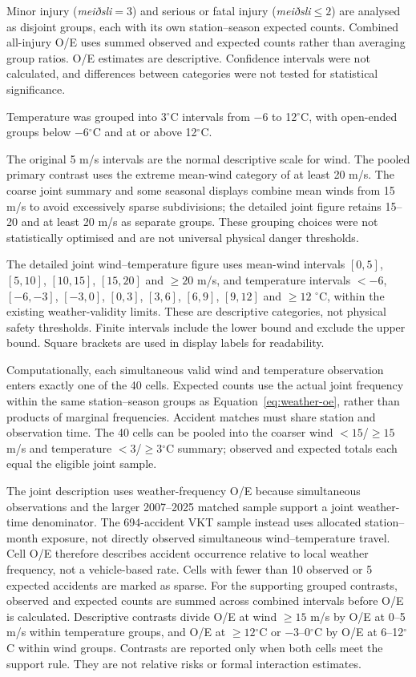 Minor injury (\textit{meiðsli}\(=3\)) and serious or fatal injury
(\textit{meiðsli}\(\leq2\)) are analysed as disjoint groups, each with its
own station--season expected counts. Combined all-injury O/E uses summed
observed and expected counts rather than averaging group ratios. O/E estimates are descriptive. Confidence intervals were not calculated,
and differences between categories were not tested for statistical significance.

Temperature was grouped into 3$^{\circ}$C intervals from $-6$ to 12$^{\circ}$C, with open-ended groups below $-6$$^{\circ}$C and at or above 12$^{\circ}$C.

The original 5 m/s intervals are the normal descriptive scale for wind. The pooled primary contrast uses the extreme mean-wind category of at least 20 m/s. The coarse joint summary and some seasonal displays combine mean winds from 15 m/s to avoid excessively sparse subdivisions; the detailed joint figure retains 15--20 and at least 20 m/s as separate groups. These grouping choices were not statistically optimised and are not universal physical danger thresholds.

The detailed joint wind--temperature figure uses mean-wind intervals $[0,5]$, $[5,10]$, $[10,15]$, $[15,20]$ and $\geq20$ m/s, and temperature intervals $<-6$, $[-6,-3]$, $[-3,0]$, $[0,3]$, $[3,6]$, $[6,9]$, $[9,12]$ and $\geq12$ $^{\circ}$C, within the existing weather-validity limits. These are descriptive categories, not physical safety thresholds. Finite intervals include the lower bound and exclude the upper bound. Square brackets are used in display labels for readability.

Computationally, each simultaneous valid wind and temperature observation enters exactly one of the 40 cells. Expected counts use the actual joint frequency within the same station--season groups as Equation~\ref{eq:weather-oe}, rather than products of marginal frequencies. Accident matches must share station and observation time. The 40 cells can be pooled into the coarser wind $<15$/\(\geq15\) m/s and temperature $<3$/\(\geq3\)$^{\circ}$C summary; observed and expected totals each equal the eligible joint sample.

The joint description uses weather-frequency O/E because simultaneous observations and the larger 2007--2025 matched sample support a joint weather-time denominator. The 694-accident VKT sample instead uses allocated station--month exposure, not directly observed simultaneous wind--temperature travel. Cell O/E therefore describes accident occurrence relative to local weather frequency, not a vehicle-based rate. Cells with fewer than 10 observed or 5 expected accidents are marked as sparse. For the supporting grouped contrasts, observed and expected counts are summed across combined intervals before O/E is calculated. Descriptive contrasts divide O/E at wind \(\geq15\) m/s by O/E at 0--5 m/s within temperature groups, and O/E at \(\geq12\)$^{\circ}$C or $-3$--0$^{\circ}$C by O/E at 6--12$^{\circ}$C within wind groups. Contrasts are reported only when both cells meet the support rule. They are not relative risks or formal interaction estimates.

